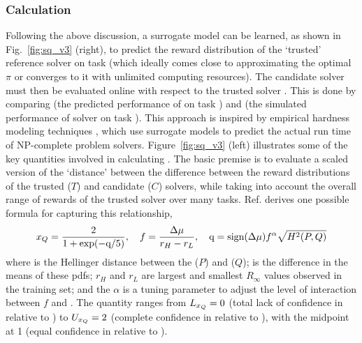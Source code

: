 \subsubsection{Calculation} \label{sec:methodology}
Following the above discussion, a surrogate model \surrogate{} can be learned,  as shown in Fig.~\ref{fig:sq_v3} (right), to predict the reward distribution \rwdtrustapprox{} of the `trusted' reference solver \solvetrust{} on task \task{} (which ideally comes close to approximating the optimal $\pi$ or converges to it with unlimited computing resources). The candidate solver \solve{} must then be evaluated online with respect to the trusted solver \solvetrust{}. This is done by comparing \rwdtrustapprox{} (the predicted performance of \solvetrust{} on task \task) and \rwd{} (the simulated performance of solver \solve{} on task \task). %
This approach is inspired by empirical hardness modeling techniques \cite{Leyton-Brown2009-yr}, which use surrogate models to predict the actual run time of NP-complete problem solvers. 
Figure~\ref{fig:sq_v3} (left) illustrates some of the key quantities involved in calculating \xQ{}. The basic premise is to evaluate a scaled version of the `distance' between the difference between the reward distributions of the trusted ($T$) and candidate ($C$) solvers, while taking into account the overall range of rewards of the trusted solver over many tasks. %
Ref. \cite{Israelsen2018-qz} derives one possible formula for capturing this relationship,
\begin{align}
    x_{Q} = \frac{2}{1+\exp(-\text{q}/5)}, \ \ \
    f = \frac{\dmu}{r_H - r_L}, \ \ \
    \text{q} = \text{sign}(\dmu)f^{\alpha}\sqrt{\hellmet} \label{eq:SQ} %
\end{align}
where \hellmet{} is the Hellinger distance between the \rwdtrust{} ($P$) and \rwdcand{} ($Q$); \dmu{} is the difference in the means of these pdfs; %
$r_H$ and $r_L$ are largest and smallest $R_{\infty}$ values observed in the \solvetrust{} training set; and the $\alpha$ is a tuning parameter to adjust the level of interaction between $f$ and \hell{}. The quantity \xQ{} ranges from $L_{x_Q} = 0$ (total lack of confidence in \solve{} relative to \solvetrust{}) to $U_{x_Q}=2$ (complete confidence in \solve{} relative to \solvetrust{}), with the midpoint at 1 (equal confidence in \solve{} relative to \solvetrust{}). 
